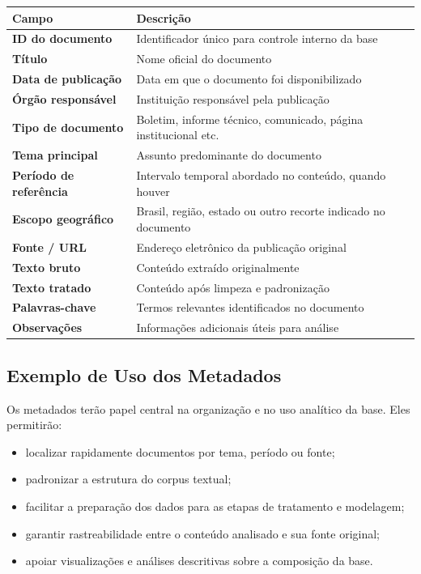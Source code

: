 \documentclass[12pt,a4paper]{article}
\begin{document}
\begin{center}
\renewcommand{\arraystretch}{1.25}
\begin{tabularx}{\textwidth}{>{\bfseries}p{4.5cm} Y}
\toprule
Campo & Descrição \\
\midrule
ID do documento & Identificador único para controle interno da base \\
Título & Nome oficial do documento \\
Data de publicação & Data em que o documento foi disponibilizado \\
Órgão responsável & Instituição responsável pela publicação \\
Tipo de documento & Boletim, informe técnico, comunicado, página institucional etc. \\
Tema principal & Assunto predominante do documento \\
Período de referência & Intervalo temporal abordado no conteúdo, quando houver \\
Escopo geográfico & Brasil, região, estado ou outro recorte indicado no documento \\
Fonte / URL & Endereço eletrônico da publicação original \\
Texto bruto & Conteúdo extraído originalmente \\
Texto tratado & Conteúdo após limpeza e padronização \\
Palavras-chave & Termos relevantes identificados no documento \\
Observações & Informações adicionais úteis para análise \\
\bottomrule
\end{tabularx}
\end{center}

\subsection{Exemplo de Uso dos Metadados}

Os metadados terão papel central na organização e no uso analítico da base. Eles permitirão:

\begin{itemize}[leftmargin=1.2cm]
    \item localizar rapidamente documentos por tema, período ou fonte;
    \item padronizar a estrutura do corpus textual;
    \item facilitar a preparação dos dados para as etapas de tratamento e modelagem;
    \item garantir rastreabilidade entre o conteúdo analisado e sua fonte original;
    \item apoiar visualizações e análises descritivas sobre a composição da base.
\end{itemize}
\end{document}
